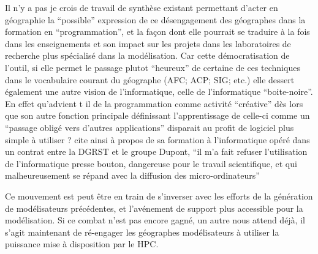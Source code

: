 Il n’y a pas je crois de travail de synthèse existant permettant d'acter en géographie la “possible” expression de ce désengagement des géographes dans la formation en “programmation”, et la façon dont elle pourrait se traduire à la fois dans les enseignements et son impact sur les projets dans les laboratoires de recherche plus spécialisé dans la modélisation. Car cette démocratisation de l’outil, si elle permet le passage  plutot \enquote{heureux} de certaine de ces techniques dans le vocabulaire courant du géographe (AFC; ACP; SIG; etc.) \autocite{Pumain2002} elle dessert également une autre vision de l'informatique, celle de l'informatique \enquote{boite-noire}. En effet qu’advient t il de la programmation comme activité “créative” dès lors que son autre fonction principale définissant l’apprentissage de celle-ci comme un \enquote{passage obligé vers d’autres applications} disparait au profit de logiciel plus simple à utiliser ? \textcite[4]{LeBerre1987} cite ainsi à propos de sa formation à l’informatique opéré dans un contrat entre la DGRST et le groupe Dupont, \enquote{il m’a fait refuser l’utilisation de l’informatique presse bouton, dangereuse pour le travail scientifique, et qui malheureusement se répand avec la diffusion des micro-ordinateurs}

Ce mouvement est peut être en train de s'inverser avec les efforts de la génération de modélisateurs précédentes, et l'avénement de support plus accessible pour la modélisation. Si ce combat n'est pas encore gagné, un autre nous attend déjà, il s'agit maintenant de ré-engager les géographes modélisateurs à utiliser la puissance mise à disposition par le HPC.

